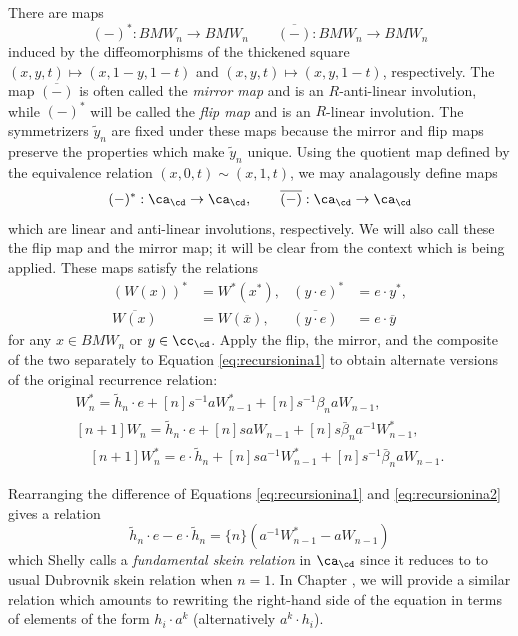 There are maps
\[
	(-)^*: BMW_n \to BMW_n \qquad \overline{(-)}: BMW_n \to BMW_n
\]
induced by the diffeomorphisms of the thickened square $(x, y, t) \mapsto (x, 1-y, 1-t)$ and $(x, y, t) \mapsto (x, y, 1-t)$, respectively. The map $\overline{(-)}$ is often called the \emph{mirror map} and is an $R$-anti-linear involution, while $(-)^*$ will be called the \emph{flip map} and is an $R$-linear involution. The symmetrizers $\tilde{y}_n$ are fixed under these maps because the mirror and flip maps preserve the properties which make $\tilde{y}_n$ unique.
Using the quotient map defined by the equivalence relation $(x, 0, t) \sim (x, 1, t)$, we may analagously define maps
\[
	(-)^*: \ca_\cd \to \ca_\cd, \qquad \overline{(-)}: \ca_\cd \to \ca_\cd
\]
which are linear and anti-linear involutions, respectively. We will also call these the flip map and the mirror map; it will be clear from the context which is being applied. These maps satisfy the relations
\begin{align*}
	\left( W \left( x \right) \right)^* &= W^* \left( x^* \right), & (y \cdot e)^* &= e \cdot y^*, \\
	\overline{W \left( x \right)} &= W \left( \overline{x} \right), & \overline{(y \cdot e)} &= e \cdot \overline{y}
\end{align*}
for any $x \in BMW_n$ or $y \in \cc_\cd$. Apply the flip, the mirror, and the composite of the two separately to Equation \eqref{eq:recursionina1} to obtain alternate versions of the original recurrence relation:
\begin{align} 
[n+1] W^*_n = \tilde{h}_n \cdot e + [n] s^{-1} a W^*_{n-1} + [n] s^{-1} \beta_n a W_{n-1} \label{eq:recursionina2}, \\
[n+1] W_n = \tilde{h}_n \cdot e + [n] s a W_{n-1} + [n] s \bar{\beta}_n a^{-1} W^*_{n-1} \label{eq:recursionina3}, \\
\quad [n+1] W^*_n = e \cdot \tilde{h}_n + [n] s a^{-1} W^*_{n-1} + [n] s^{-1} \bar{\beta}_n a W_{n-1}. \label{eq:recursionina4}
\end{align}

Rearranging the difference of Equations \eqref{eq:recursionina1} and \eqref{eq:recursionina2} gives a relation
\begin{equation}
\tilde{h}_n \cdot e - e \cdot \tilde{h}_n = \{n\} (a^{-1} W^*_{n-1} - a W_{n-1})
\end{equation}
which Shelly calls a \textit{fundamental skein relation} in $\ca_\cd$ since it reduces to to usual Dubrovnik skein relation when $n=1$.  In Chapter , we will provide a similar relation which amounts to rewriting the right-hand side of the equation in terms of elements of the form $h_i \cdot a^k$ (alternatively $a^k \cdot h_i$). 



